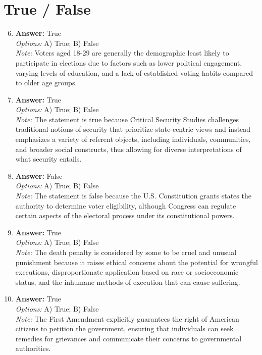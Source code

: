 \documentclass[12pt]{article}
\begin{document}
\section*{True / False}
\begin{enumerate}[label=\arabic*.]
\setcounter{enumi}{5}
\item \textbf{Answer:} True
\\ \textit{Options:} A) True; B) False
\\ \textit{Note:} Voters aged 18-29 are generally the demographic least likely to participate in elections due to factors such as lower political engagement, varying levels of education, and a lack of established voting habits compared to older age groups.
\item \textbf{Answer:} True
\\ \textit{Options:} A) True; B) False
\\ \textit{Note:} The statement is true because Critical Security Studies challenges traditional notions of security that prioritize state-centric views and instead emphasizes a variety of referent objects, including individuals, communities, and broader social constructs, thus allowing for diverse interpretations of what security entails.
\item \textbf{Answer:} False
\\ \textit{Options:} A) True; B) False
\\ \textit{Note:} The statement is false because the U.S. Constitution grants states the authority to determine voter eligibility, although Congress can regulate certain aspects of the electoral process under its constitutional powers.
\item \textbf{Answer:} True
\\ \textit{Options:} A) True; B) False
\\ \textit{Note:} The death penalty is considered by some to be cruel and unusual punishment because it raises ethical concerns about the potential for wrongful executions, disproportionate application based on race or socioeconomic status, and the inhumane methods of execution that can cause suffering.
\item \textbf{Answer:} True
\\ \textit{Options:} A) True; B) False
\\ \textit{Note:} The First Amendment explicitly guarantees the right of American citizens to petition the government, ensuring that individuals can seek remedies for grievances and communicate their concerns to governmental authorities.
\end{enumerate}
\end{document}
